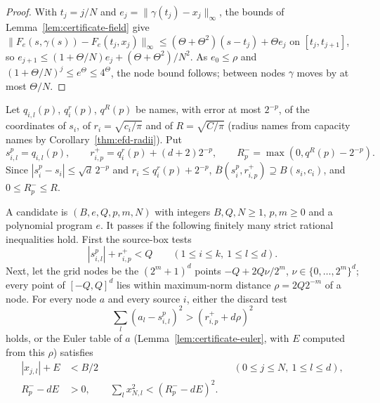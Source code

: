 \begin{proof}
With $t_j=j/N$ and $e_j=\|\gamma(t_j)-x_j\|_\infty$, the bounds of Lemma~\ref{lem:certificate-field} give $\|F_e(s,\gamma(s))-F_e(t_j,x_j)\|_\infty\le(\Theta+\Theta^2)(s-t_j)+\Theta e_j$ on $[t_j,t_{j+1}]$, so $e_{j+1}\le(1+\Theta/N)e_j+(\Theta+\Theta^2)/N^2$. As $e_0\le\rho$ and $(1+\Theta/N)^j\le e^\Theta\le4^\Theta$, the node bound follows; between nodes $\gamma$ moves by at most $\Theta/N$.
\end{proof}

Let $q_{i,l}(p)$, $q_i^r(p)$, $q^R(p)$ be names, with error at most $2^{-p}$, of the coordinates of $s_i$, of $r_i=\sqrt{c_i/\pi}$ and of $R=\sqrt{C/\pi}$ (radius names from capacity names by Corollary~\ref{thm:efd-radii}). Put
\begin{equation}\label{eq:certificate-enclosures}
 s^p_{i,l}=q_{i,l}(p),\qquad
 r^+_{i,p}=q_i^r(p)+(d+2)2^{-p},\qquad
 R^-_p=\max(0,q^R(p)-2^{-p}).
\end{equation}
Since $|s_i^p-s_i|\le\sqrt d\,2^{-p}$ and $r_i\le q_i^r(p)+2^{-p}$, $\overline B(s_i^p,r^+_{i,p})\supseteq B(s_i,c_i)$, and $0\le R^-_p\le R$.

\begin{definition}\label{def:certificate-checks}
A candidate is $(B,e,Q,p,m,N)$ with integers $B,Q,N\ge1$, $p,m\ge0$ and a polynomial program $e$. It passes if the
following finitely many strict rational inequalities hold. First the source-box tests
\[
 |s^p_{i,l}|+r^+_{i,p}<Q\qquad(1\le i\le k,\ 1\le l\le d).
\]
Next, let the grid nodes be the $(2^m+1)^d$ points $-Q+2Q\nu/2^m$, $\nu\in\{0,\dots,2^m\}^d$; every point of
$[-Q,Q]^d$ lies within maximum-norm distance $\rho=2Q2^{-m}$ of a node. For every node $a$ and every source $i$,
either the discard test
\begin{equation}\label{eq:certificate-discard}
 \sum_l(a_l-s^p_{i,l})^2>(r^+_{i,p}+d\rho)^2
\end{equation}
holds, or the Euler table of $a$ (Lemma~\ref{lem:certificate-euler}, with $E$ computed from this $\rho$) satisfies
\begin{align}
 |x_{j,l}|+E&<B/2 &&(0\le j\le N,\ 1\le l\le d),\label{eq:certificate-plateau}\\
 R^-_p-dE&>0,\qquad
 \sum_l x_{N,l}^2<(R^-_p-dE)^2.\label{eq:certificate-target}
\end{align}
\end{definition}

